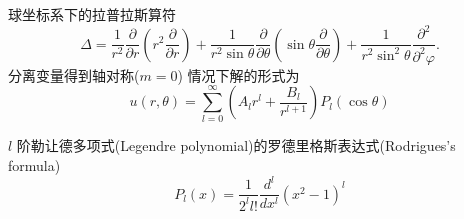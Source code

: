 \documentclass{njustexam}
\begin{document}
球坐标系下的拉普拉斯算符
\begin{equation*}
 \Delta = \frac{1}{r^2} \frac{\partial}{\partial r} \left( r^2 \frac{\partial }{\partial r} \right)
  + \frac{1}{r^2\sin \theta} \frac{\partial}{\partial \theta} \left( \sin\theta \frac{\partial}{\partial \theta} \right)
  + \frac{1}{r^2\sin^2 \theta} \frac{\partial^2}{\partial^2 \varphi} .
\end{equation*}
分离变量得到轴对称($m=0$)
情况下解的形式为
\begin{equation*}
  u(r,  \theta) = \sum_{l=0}^{\infty} \left( A_l r^l + \frac{B_l}{r^{l+1}} \right) P_{l} (\cos \theta)
\end{equation*}

\bigskip

$l$ 阶勒让德多项式(Legendre polynomial)的罗德里格斯表达式(Rodrigues's formula) 
$$P_l(x)=\frac{1}{2^l l !} \frac{d^l}{d x^l}\left(x^2-1\right)^l$$
\end{document}
